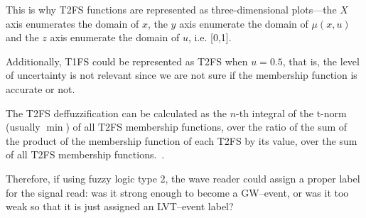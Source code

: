 \documentclass[titlepage, letterpaper, fleqn]{article}
\begin{document}
This is why T2FS functions are represented as three-dimensional plots---the $X$ axis enumerates the domain of $x$, the $y$ axis enumerate the domain of $\mu(x,u)$ and the $z$ axis enumerate the domain of $u$, i.e. [0,1].

Additionally, T1FS could be represented as T2FS when $u=0.5$, that is, the level of uncertainty is not relevant since we are not sure if the membership function is accurate or not.

The T2FS deffuzzification can be calculated as the $n$-th integral of the t-norm (usually $\min$) of all T2FS membership functions, over the ratio of the sum of the product of the membership function of each T2FS by its value, over the sum of all T2FS membership functions.~\cite{Ponce-Cruz16}.

Therefore, if using fuzzy logic type 2, the wave reader could assign a proper label for the signal read: was it strong enough to become a GW--event, or was it too weak so that it is just assigned an LVT--event label?



\end{document}
